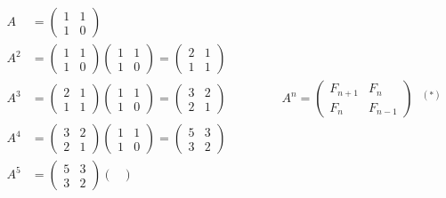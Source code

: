 \documentclass[12pt]{article}
\theoremstyle{definition}
\begin{document}
				\[\begin{aligned}
				A\ &=\begin{pmatrix}
					1	&	1	\\
					1	&	0	
				\end{pmatrix}\\
				A^2&= \begin{pmatrix}
					1	&	1	\\
					1	&	0	
				\end{pmatrix} \begin{pmatrix}
					1	&	1	\\
					1	&	0	
				\end{pmatrix}=\begin{pmatrix}
					2	&	1	\\
					1	&	1	
				\end{pmatrix}  \\
				A^3&=\begin{pmatrix}
					2	&	1	\\
					1	&	1	
				\end{pmatrix} \begin{pmatrix}
					1	&	1	\\
					1	&	0	
				\end{pmatrix}=\begin{pmatrix}
					3	&	2	\\
					2	&	1	
				\end{pmatrix} \ \ \ \ \ \ \ \ \ \ \ \ \ \ \ \ \ \ \ \ 
				 							A^n = \begin{pmatrix}
													F_{n+1}	& F_{n}\\
													F_n		&	F_{n-1}
											\end{pmatrix}\ \ \ ^{(\boldsymbol{*})}\\
				A^4&=\begin{pmatrix}
					3	&	2	\\
					2	&	1	
				\end{pmatrix} \begin{pmatrix}
					1	&	1	\\
					1	&	0	
				\end{pmatrix}=\begin{pmatrix}
					5	&	3	\\
					3	&	2	
				\end{pmatrix}\\
				A^5&=\begin{pmatrix}
					5	&	3	\\
					3	&	2	
				\end{pmatrix} \begin{pmatrix}

\end{pmatrix}
\end{aligned}\]
\end{document}
